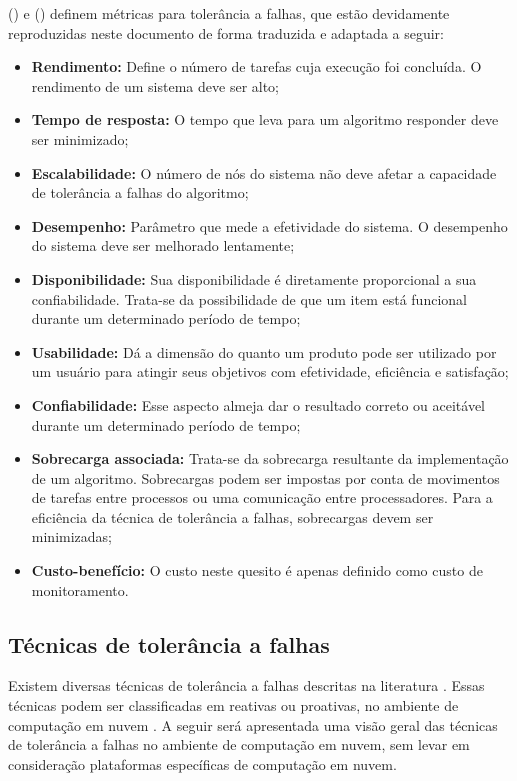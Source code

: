 \documentclass[
	12pt,				%
	oneside,			%
	a4paper,			%
	chapter=TITLE,		%
	english,			%
	french,				%
	spanish,			%
	brazil				%
	]{abntex2}
\begin{document}
\citeauthor{amin2015review} (\citeyear{amin2015review}) e \citeauthor{patra2013fault} (\citeyear{patra2013fault}) definem métricas para tolerância a falhas, que estão devidamente reproduzidas neste documento de forma traduzida e adaptada a seguir:

\begin{itemize}
        \item \textbf{Rendimento:}  Define o número de tarefas cuja execução foi concluída. O rendimento de um sistema deve ser alto;
        \item \textbf{Tempo de resposta:} O tempo que leva para um algoritmo responder deve ser minimizado;
        \item\textbf{Escalabilidade:} O número de nós do sistema não deve afetar a capacidade de tolerância a falhas do algoritmo;
        \item\textbf{Desempenho:} Parâmetro que mede a efetividade do sistema. O desempenho do sistema deve ser melhorado lentamente;
        \item\textbf{Disponibilidade:} Sua disponibilidade é diretamente proporcional a sua confiabilidade. Trata-se da possibilidade de que um item está funcional durante um determinado período de tempo;
        \item\textbf{Usabilidade:} Dá a dimensão do quanto um produto pode ser utilizado por um usuário para atingir seus objetivos com efetividade, eficiência e satisfação;
        \item\textbf{Confiabilidade:} Esse aspecto almeja dar o resultado correto ou aceitável durante um determinado período de tempo;
        \item\textbf{Sobrecarga associada:} Trata-se da sobrecarga resultante da implementação de um algoritmo. Sobrecargas podem ser impostas por conta de movimentos de tarefas entre processos ou uma comunicação entre processadores. Para a eficiência da técnica de tolerância a falhas, sobrecargas devem ser minimizadas;
        \item\textbf{Custo-benefício:} O custo neste quesito é apenas definido como custo de monitoramento.
\end{itemize}

\subsection{Técnicas de tolerância a falhas}

Existem diversas técnicas de tolerância a falhas descritas na literatura \cite{cheraghlou2016survey, ataallah2015fault, jhawar2012fault}. Essas técnicas podem ser classificadas em reativas ou proativas, no ambiente de computação em nuvem \cite{bala2012fault}. A seguir será apresentada uma visão geral das técnicas de tolerância a falhas no ambiente de computação em nuvem, sem levar em consideração plataformas específicas de computação em nuvem.
\end{document}
